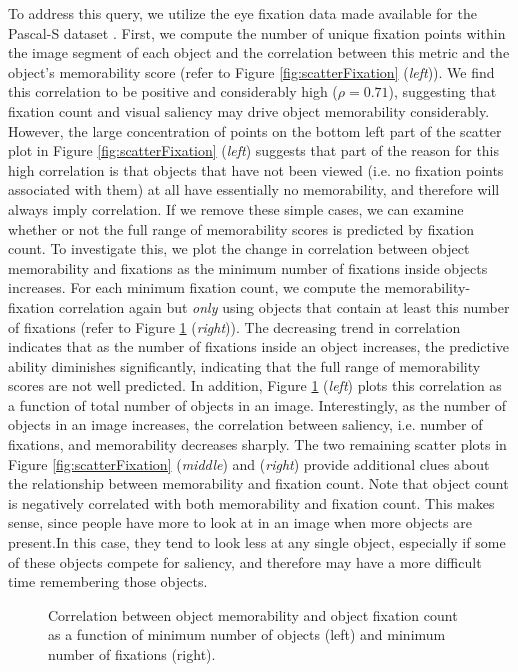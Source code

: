 To address this query, we utilize the eye fixation data made available for the Pascal-S dataset \cite{yin14}. First, we compute the number of unique fixation points within the image segment of each object and the correlation between this metric and the object's memorability score (refer to Figure \ref{fig:scatterFixation} (\emph{left})). We find this correlation to be positive and considerably high ($\rho = 0.71$), suggesting that fixation count and visual saliency may drive object memorability considerably. However, the large concentration of points on the bottom left part of the scatter plot in Figure \ref{fig:scatterFixation} (\emph{left}) suggests that part of the reason for this high correlation is that objects that have not been viewed (i.e. no fixation points associated with them) at all have essentially no memorability, and therefore will always imply correlation. If we remove these simple cases, we can examine whether or not the full range of memorability scores is predicted by fixation count. To investigate this, we plot the change in correlation between object memorability and fixations as the minimum number of fixations inside objects increases. For each minimum fixation count, we compute the memorability-fixation correlation again but \emph{only} using objects that contain at least this number of fixations (refer to Figure \ref{fig:fixCorr} (\emph{right})). The decreasing trend in correlation indicates that as the number of fixations inside an object increases, the predictive ability diminishes significantly, indicating that the full range of memorability scores are not well predicted. In addition, Figure \ref{fig:fixCorr} (\emph{left}) plots this correlation as a function of total number of objects in an image. Interestingly, as the number of objects in an image increases, the correlation between saliency, i.e. number of fixations, and memorability decreases sharply.
The two remaining scatter plots in Figure \ref{fig:scatterFixation} (\emph{middle}) and (\emph{right}) provide additional clues about the relationship between memorability and fixation count. Note that object count is negatively correlated with both memorability and fixation count. This makes sense, since people have more to look at in an image when more objects are present.In this case, they tend to look less at any single object, especially if some of these objects compete for saliency, and therefore may have a more difficult time remembering those objects.

\begin{figure}[t]
\centering
{}
\vspace{-5mm}\caption{\footnotesize Correlation between object memorability and object fixation count as a function of minimum number of objects (left) and
minimum number of fixations (right). }\label{fig:fixCorr}\vspace{-4pt}
\end{figure}

